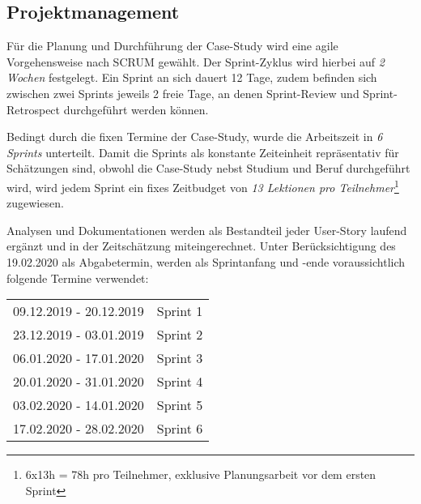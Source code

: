 \subsection{Projektmanagement}
Für die Planung und Durchführung der Case-Study wird eine agile Vorgehensweise nach SCRUM gewählt. Der Sprint-Zyklus wird hierbei auf \emph{2 Wochen} festgelegt. Ein Sprint an sich dauert 12 Tage, zudem befinden sich zwischen zwei Sprints jeweils 2 freie Tage, an denen Sprint-Review und Sprint-Retrospect durchgeführt werden können.

Bedingt durch die fixen Termine der Case-Study, wurde die Arbeitszeit in \emph{6 Sprints} unterteilt. Damit die Sprints als konstante Zeiteinheit repräsentativ für Schätzungen sind, obwohl die Case-Study nebst Studium und Beruf durchgeführt wird, wird jedem Sprint ein fixes Zeitbudget von \emph{13 Lektionen pro Teilnehmer}\footnote{6x13h = 78h pro Teilnehmer, exklusive Planungsarbeit vor dem ersten Sprint} zugewiesen.

Analysen und Dokumentationen werden als Bestandteil jeder User-Story laufend ergänzt und in der Zeitschätzung miteingerechnet. Unter Berücksichtigung des 19.02.2020 als Abgabetermin, werden als Sprintanfang und -ende voraussichtlich folgende Termine verwendet:

\begin{center}
  \begin{tabular}{ c c } 
    09.12.2019 - 20.12.2019 & Sprint 1 \\ 
    23.12.2019 - 03.01.2019 & Sprint 2 \\ 
    06.01.2020 - 17.01.2020 & Sprint 3 \\ 
    20.01.2020 - 31.01.2020 & Sprint 4 \\
    03.02.2020 - 14.01.2020 & Sprint 5 \\
    17.02.2020 - 28.02.2020 & Sprint 6 \\ 
  \end{tabular}
\end{center}
